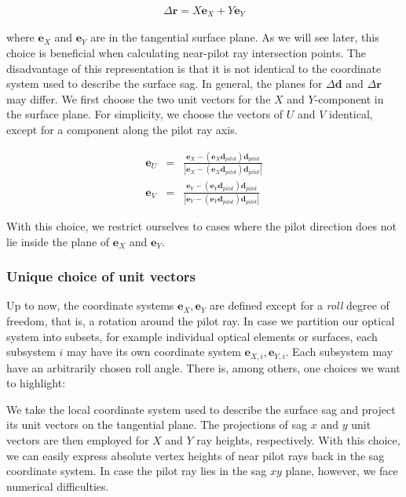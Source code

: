 \documentclass[12pt,a4paper,twoside,openright,BCOR10mm,headsepline,titlepage,abstracton,chapterprefix,final]{scrreprt}
\newcommand\Vector[1]{{\mathbf{#1}}}
\begin{document}
\begin{eqnarray}
 \Delta\Vector{r} = X \Vector{e}_{X} + Y \Vector{e}_{Y}
 \label{eq:deltaR_equals_XY}
\end{eqnarray}

where $\Vector{e}_{X}$ and $\Vector{e}_{Y}$ are in the tangential surface plane.
As we will see later, this choice is beneficial when calculating near-pilot ray intersection points.
The disadvantage of this representation is that it is not identical to the coordinate system used to describe the surface sag.
In general, the planes for $\Delta\Vector{d}$ and $\Delta\Vector{r}$ may differ.
We first choose the two unit vectors for the $X$ and $Y$-component in the surface plane.
For simplicity, we choose the vectors of $U$ and $V$ identical,
except for a component along the pilot ray axis.

\begin{eqnarray}
 \Vector{e}_{U} &=& \frac{\Vector{e}_{X} - (\Vector{e}_{X}\Vector{d}_{pilot})\Vector{d}_{pilot}}{|\Vector{e}_{X} - (\Vector{e}_{X}\Vector{d}_{pilot})\Vector{d}_{pilot}|}
 \\[2ex]
 \Vector{e}_{V} &=& \frac{\Vector{e}_{Y} - (\Vector{e}_{Y}\Vector{d}_{pilot})\Vector{d}_{pilot}}{|\Vector{e}_{Y} - (\Vector{e}_{Y}\Vector{d}_{pilot})\Vector{d}_{pilot}|}
\end{eqnarray}

With this choice, we restrict ourselves to cases where the pilot direction does not lie inside the plane of $\Vector{e}_{X}$ and $\Vector{e}_{Y}$.

\subsubsection{Unique choice of unit vectors}
Up to now, the coordinate systems $\Vector{e}_{X}, \Vector{e}_{Y}$ are defined except for a \emph{roll} degree of freedom, that is, a rotation around the pilot ray.
In case we partition our optical system into subsets, for example individual optical elements or surfaces, each subsystem $i$ may have its own coordinate system
$\Vector{e}_{X,i}, \Vector{e}_{Y,i}$.
Each subsystem may have an arbitrarily chosen roll angle. 
There is, among others, one choices we want to highlight:

We take the local coordinate system used to describe the surface sag and project its unit vectors on the tangential plane.
The projections of sag $x$ and $y$ unit vectors are then employed for $X$ and $Y$ ray heights, respectively.
With this choice, we can easily express absolute vertex heights of near pilot rays back in the sag coordinate system. 
In case the pilot ray lies in the sag $xy$ plane, however, we face numerical difficulties.
\end{document}
